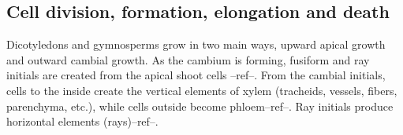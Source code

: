\subsection{Cell division, formation, elongation and death}
Dicotyledons and gymnosperms grow in two main ways, upward apical growth and
outward cambial growth.  As the cambium is forming, fusiform and ray initials
are created from the apical shoot cells --ref--. From the cambial initials,
cells to the inside create the vertical elements of xylem (tracheids, vessels,
fibers, parenchyma, etc.), while cells outside become phloem--ref--. Ray
initials produce horizontal elements (rays)--ref--.